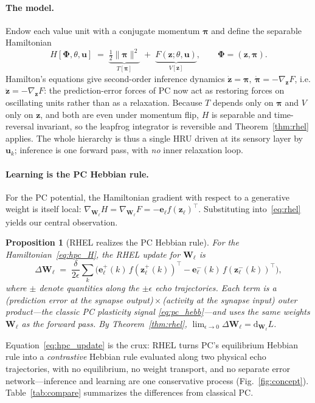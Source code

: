 \documentclass[10pt]{article}
\newtheorem{proposition}{Proposition}
\theoremstyle{remark}
\newcommand{\bz}{\mathbf{z}}
\newcommand{\bpi}{\boldsymbol{\pi}}
\newcommand{\bPhi}{\boldsymbol{\Phi}}
\newcommand{\bW}{\mathbf{W}}
\newcommand{\bu}{\mathbf{u}}
\newcommand{\eps}{\epsilon}
\newcommand{\grad}{\nabla}
\newcommand{\half}{\tfrac{1}{2}}
\begin{document}
\paragraph{The model.} Endow each value unit with a conjugate momentum $\bpi$
and define the separable Hamiltonian
\begin{equation}
\label{eq:hpc_H}
H[\bPhi,\theta,\bu] \;=\; \underbrace{\half\|\bpi\|^2}_{T[\bpi]}
\;+\; \underbrace{F(\bz;\theta,\bu)}_{V[\bz]},
\qquad \bPhi=(\bz,\bpi).
\end{equation}
Hamilton's equations give second-order inference dynamics
$\dot{\bz}=\bpi,\ \dot{\bpi}=-\grad_{\bz}F$, i.e. $\ddot{\bz}=-\grad_{\bz}F$:
the prediction-error forces of PC now act as restoring forces on oscillating
units rather than as a relaxation. Because $T$ depends only on $\bpi$ and $V$
only on $\bz$, and both are even under momentum flip, $H$ is separable and
time-reversal invariant, so the leapfrog integrator is reversible and
Theorem~\ref{thm:rhel} applies. The whole hierarchy is thus a single HRU
driven at its sensory layer by $\bu_k$; inference is one forward pass, with
\emph{no} inner relaxation loop.

\paragraph{Learning is the PC Hebbian rule.} For the PC potential, the
Hamiltonian gradient with respect to a generative weight is itself local:
$\grad_{\bW_\ell}H=\grad_{\bW_\ell}F=-\mathbf{e}_\ell f(\bz_\ell)^{\!\top}$.
Substituting into~\eqref{eq:rhel} yields our central observation.
\begin{proposition}[RHEL realizes the PC Hebbian rule]
\label{prop:local}
For the Hamiltonian~\eqref{eq:hpc_H}, the RHEL update for $\bW_\ell$ is
\begin{equation}
\label{eq:hpc_update}
\Delta \bW_\ell \;=\; \frac{\delta}{2\eps}\sum_k\Big(
\mathbf{e}_\ell^{+}(k)\, f(\bz_\ell^{+}(k))^{\!\top}
- \mathbf{e}_\ell^{-}(k)\, f(\bz_\ell^{-}(k))^{\!\top}\Big),
\end{equation}
where $\pm$ denote quantities along the $\pm\eps$ echo trajectories. Each term
is a (prediction error at the synapse output)\,$\times$\,(activity at the
synapse input) outer product---the classic PC plasticity signal
\eqref{eq:pc_hebb}---and uses the same weights $\bW_\ell$ as the forward pass.
By Theorem~\ref{thm:rhel}, $\lim_{\eps\to0}\Delta\bW_\ell=\mathrm{d}_{\bW_\ell}L$.
\end{proposition}
Equation~\eqref{eq:hpc_update} is the crux: RHEL turns PC's
equilibrium Hebbian rule into a \emph{contrastive} Hebbian rule evaluated
along two physical echo trajectories, with no equilibrium, no weight
transport, and no separate error network---inference and learning are one
conservative process (Fig.~\ref{fig:concept}). Table~\ref{tab:compare}
summarizes the differences from classical PC.
\end{document}
